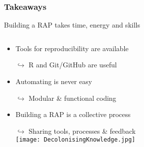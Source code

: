 \documentclass[xcolor=x11names,compress]{beamer}
\renewcommand{\(}{\begin{columns}}
\renewcommand{\)}{\end{columns}}
\newcommand{\<}[1]{\begin{column}{#1}}
\renewcommand{\>}{\end{column}}
\begin{document}
\begin{frame}
\frametitle{Takeaways}
Building a RAP takes time, energy and skills
\pause
\begin{columns}[t]
 \begin{column}{0.8\textwidth}
 \begin{itemize}[<+->]
        \item Tools for reproducibility are available
        \item[$\hookrightarrow$] R and Git/GitHub are useful
        \item Automating is never easy
        \item[$\hookrightarrow$] Modular \& functional coding
        \item Building a RAP is a collective process
        \item[$\hookrightarrow$] Sharing tools, processes \& feedback \\
        \texttt{[image: DecolonisingKnowledge.jpg]}
    \end{itemize}
 \end{column}
  \begin{column}{0.2\textwidth}
    \begin{center}
    \begin{itemize}
 
    \end{itemize}
    \end{center}
  \end{column}
\end{columns}
\end{frame}
\end{document}
